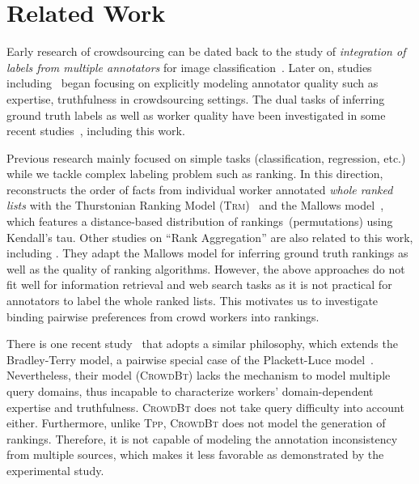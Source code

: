 \section{Related Work} \label{sec::tpp_related_work}

Early research of crowdsourcing can be dated back to the study of
\emph{integration of labels from multiple annotators} for image
classification~\cite{smyth1995inferring}. Later on, studies
including~\cite{yan2010modeling,whitehill2009whose} began focusing on explicitly
modeling annotator quality  such as expertise, truthfulness in crowdsourcing
settings. The dual tasks of inferring ground truth labels as well as worker
quality have been investigated in some recent
studies~\cite{yan2010modeling,whitehill2009whose,welinder2010multidimensional},
including this work.

Previous  research mainly focused on simple tasks (classification, regression,
etc.) while we tackle complex labeling problem such as ranking. In this
direction, \cite{steyvers2009wisdom} reconstructs the order of facts from
individual worker annotated \emph{whole ranked lists} with the Thurstonian
Ranking Model (\textsc{Trm})~\cite{thurstone1927law} and the Mallows
model~\cite{mallows1957non}, which features a distance-based distribution of
rankings~(permutations) using Kendall's tau.  Other studies on ``Rank
Aggregation'' are also related to this work, including
\cite{klementiev2008unsupervised,klementiev2009unsupervised}. They adapt the
Mallows model for inferring ground truth rankings as well as the quality of
ranking algorithms. However, the above approaches do not fit well for
information retrieval and web search tasks as it is not practical for annotators
to label the whole ranked lists. This motivates us to investigate binding
pairwise preferences from crowd workers into rankings.

There is one recent study~\cite{chen2013pairwise} that adopts a similar
philosophy, which extends the Bradley-Terry model, a pairwise special case of
the Plackett-Luce model~\cite{luce2005individual,plackett1975analysis}.
Nevertheless, their model (\textsc{CrowdBt}) lacks the mechanism to model
multiple query domains, thus incapable to characterize workers' domain-dependent
expertise and truthfulness. \textsc{CrowdBt} does not take query difficulty into
account either. Furthermore, unlike \textsc{Tpp}, \textsc{CrowdBt} does not
model the  generation of rankings. Therefore, it is not capable of modeling the
annotation inconsistency from multiple sources, which makes it less favorable as
demonstrated by the experimental study.
